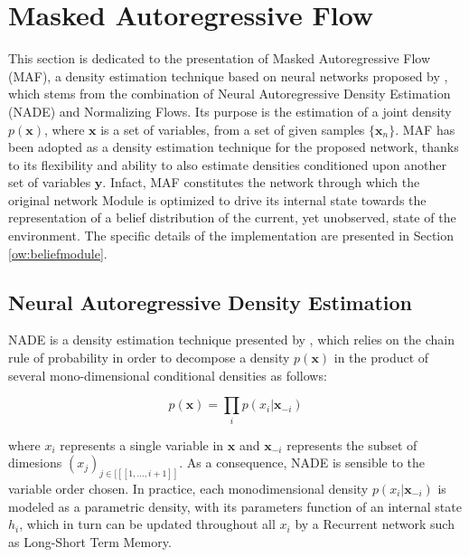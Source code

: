     \section{Masked Autoregressive Flow}
        \label{prel:maf}
        This section is dedicated to the presentation of Masked Autoregressive Flow (MAF), a density estimation technique based on neural networks proposed by , which stems from the combination of Neural Autoregressive Density Estimation (NADE) and Normalizing Flows. Its purpose is the estimation of a joint density $p(\mathbf{x})$, where $\mathbf{x}$ is a set of variables, from a set of given samples $\{ \mathbf{x}_n \}$. \newline
        MAF has been adopted as a density estimation technique for the proposed network, thanks to its flexibility and ability to also estimate densities conditioned upon another set of variables $\mathbf{y}$. Infact, MAF constitutes the network through which the original network Module is optimized to drive its internal state towards the representation of a belief distribution of the current, yet unobserved, state of the environment. The specific details of the implementation are presented in Section \ref{ow:beliefmodule}.
        
        \subsection{Neural Autoregressive Density Estimation}
            NADE is a density estimation technique presented by , which relies on the chain rule of probability in order to decompose a density $p(\mathbf{x})$ in the product of several mono-dimensional conditional densities as follows:
            
            \[ p(\mathbf{x}) = \prod_{i} p(x_i | \mathbf{x}_{-i} ) \]
            
            where $x_i$ represents a single variable in $\mathbf{x}$ and $\mathbf{x}_{-i}$ represents the subset of dimesions  $(x_j)_{j\in[\![[1,\dots,i+1]\!]}$. As a consequence, NADE is sensible to the variable order chosen. In practice, each monodimensional density $p(x_i | \mathbf{x}_{-i} )$ is modeled as a parametric density, with its parameters function of an internal state $h_i$, which in turn can be updated throughout all $x_i$ by a Recurrent network such as Long-Short Term Memory.
            
